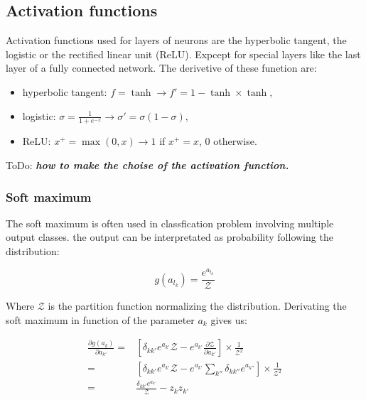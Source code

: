 \documentclass[final, paper=letter,5p,times,twocolumn]{elsarticle}
\newcommand{\ToDo}[1]{ToDo: \textbf{\textit{#1}}}
\begin{document}
\subsection{Activation functions}

Activation functions used for layers of neurons are the hyperbolic tangent, the logistic or the rectified linear unit (ReLU). Expcept for special layers like the last layer of a fully connected network. The derivetive of these funetion are:

\begin{itemize}
\item hyperbolic tangent: $f = \tanh \rightarrow f' = 1 - \tanh \times \tanh$,
\item logistic: $\sigma = \frac{1}{1+e^{-x}} \rightarrow \sigma' = \sigma (1 - \sigma)$,
\item ReLU: $x^{+} = \max(0,x) \rightarrow 1$ if $x^{+} = x$, 0 otherwise.
\end{itemize}
\ToDo{how to make the choise of the activation function.}

\subsubsection{Soft maximum}
\label{soft_max_sec}

The soft maximum is often used in classfication problem involving multiple output classes. the output can be interpretated as probability following the distribution:

\begin{equation}
  g(a_{l_{k}}) = \frac{e^{a_{l_{k}}}}{\mathcal{Z}}
  \label{soft_max}
\end{equation}

Where $\mathcal{Z}$ is the partition function normalizing the distribution. Derivating the soft maximum in function of the parameter $a_{k}$ gives us:

\begin{equation*}
  \begin{split}
    \frac{\partial g(a_{k})}{\partial a_{k'}} = & \left \lbrack \delta_{kk'} e^{a_{k'}} \mathcal{Z} - e^{a_{k'}}\frac{\partial \mathcal{Z}}{\partial a_{k'}} \right \rbrack \times \frac{1}{\mathcal{Z}^{2}}\\
    = & \left \lbrack \delta_{kk'} e^{a_{k'}} \mathcal{Z} - e^{a_{k'}} \sum_{k''} \delta_{kk''} e^{a_{k''}}  \right \rbrack \times \frac{1}{\mathcal{Z}^{2}}\\
    = & \frac{\delta_{kk'} e^{a_{k'}}}{\mathcal{Z}} - z_{k}z_{k'}\\
  \end{split}
\end{equation*}
\end{document}

